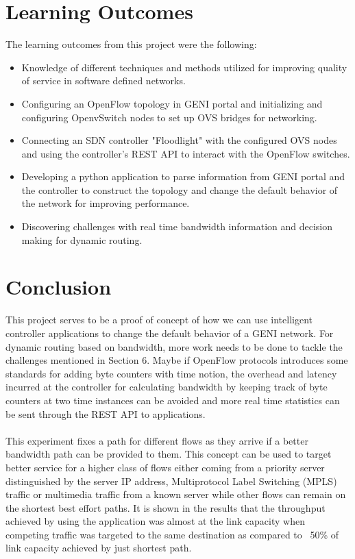 \documentclass[paper=a4, fontsize=12pt]{scrartcl}	%
\numberwithin{equation}{section}		%
\numberwithin{figure}{section}			%
\numberwithin{table}{section}				%
\begin{document}
\section{Learning Outcomes}
The learning outcomes from this project were the following:
\begin{itemize}
\item Knowledge of different techniques and methods utilized for improving quality of service in software defined networks.
\item Configuring an OpenFlow topology in GENI portal and initializing and configuring OpenvSwitch nodes to set up OVS bridges for networking.
\item Connecting an SDN controller "Floodlight" with the configured OVS nodes and using the controller's REST API to interact with the OpenFlow switches.
\item Developing a python application to parse information from GENI portal and the controller to construct the topology and change the default behavior of the network for improving performance.
\item Discovering challenges with real time bandwidth information and decision making for dynamic routing.
\end{itemize}

\section{Conclusion}
This project serves to be a proof of concept of how we can use intelligent controller applications to change the default behavior of a GENI network. For dynamic routing based on bandwidth, more work needs to be done to tackle the challenges mentioned in Section 6. Maybe if OpenFlow protocols introduces some standards for adding byte counters with time notion, the overhead and latency incurred at the controller for calculating bandwidth by keeping track of byte counters at two time instances can be avoided and more real time statistics can be sent through the REST API to applications.
\\
\\
This experiment fixes a path for different flows as they arrive if a better bandwidth path can be provided to them. This concept can be used to target better service for a higher class of flows either coming from a priority server distinguished by the server IP address, Multiprotocol Label Switching (MPLS) traffic or multimedia traffic from a known server while other flows can remain on the shortest best effort paths. It is shown in the results that the throughput achieved by using the application was almost at the link capacity when competing traffic was targeted to the same destination as compared to ~50\% of link capacity achieved by just shortest path.

\end{document}
